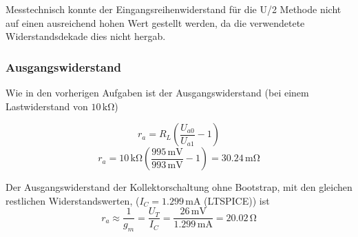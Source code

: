 Messtechnisch konnte der Eingangsreihenwiderstand für die U/2 Methode nicht auf
einen ausreichend hohen Wert gestellt werden, da die verwendetete
Widerstandsdekade dies nicht hergab.

\subsubsection{Ausgangswiderstand}
Wie in den vorherigen Aufgaben ist der Ausgangswiderstand (bei einem
Lastwiderstand von $10 \, \si{\kilo\ohm}$)

\[r_a = R_L \left( \frac{U_{a0}}{U_{a1}} -1 \right)\]
\[r_a = 10 \, \si{\kilo\ohm} \left( \frac{995 \, \si{\milli\volt}}{993 \,
      \si{\milli\volt}} -1 \right)= 30.24 \, \si{\milli\ohm}\]

Der Ausgangswiderstand der Kollektorschaltung ohne Bootstrap, mit den gleichen
restlichen Widerstandswerten, ($I_C = 1.299 \, \si{\milli\ampere}$ (LTSPICE)) ist
\[r_a \approx \frac{1}{g_m} = \frac{U_T}{I_C} = \frac{26 \,
    \si{\milli\volt}}{1.299 \, \si{\milli\ampere}} = 20.02 \, \si{\ohm}\]